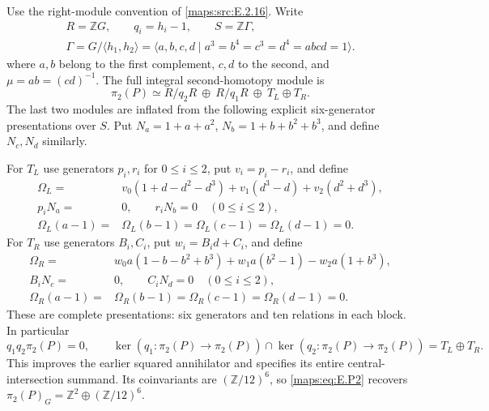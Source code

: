 \begin{theorem}\label{maps:src:E.2.17}


Use the right-module convention of \ref{maps:src:E.2.16}. Write
\[
 \begin{gathered}
 R=\mathbb ZG,\qquad q_i=h_i-1,\qquad S=\mathbb Z\Gamma,\\
 \Gamma=G/\langle h_1,h_2\rangle
  =\langle a,b,c,d\mid a^3=b^4=c^3=d^4=abcd=1\rangle.
 \end{gathered}
 \tag{E.P1}\label{maps:eq:E.P1}
\]
where $a,b$ belong to the first complement, $c,d$ to
the second, and $\mu=ab=(cd)^{-1}$. The full integral
second-homotopy module is
\[
 \pi_2(P)\simeq R/q_2R\ \oplus\ R/q_1R
                    \ \oplus\ T_L\oplus T_R.
 \tag{E.P2}\label{maps:eq:E.P2}
\]
The last two modules are inflated from the following
explicit six-generator presentations over $S$.
Put $N_a=1+a+a^2$, $N_b=1+b+b^2+b^3$, and define
$N_c,N_d$ similarly.

For $T_L$ use generators $p_i,r_i$ for $0\leq i\leq2$,
put $v_i=p_i-r_i$, and define
\[
 \begin{split}
 \Omega_L={}&v_0(1+d-d^2-d^3)
       +v_1(d^3-d)+v_2(d^2+d^3),\\
 p_iN_a={}&0,\qquad r_iN_b=0\quad(0\leq i\leq2),\\
 \Omega_L(a-1)={}&\Omega_L(b-1)
       =\Omega_L(c-1)=\Omega_L(d-1)=0.
 \end{split}
 \tag{E.P3}\label{maps:eq:E.P3}
\]
For $T_R$ use generators $B_i,C_i$, put $w_i=B_id+C_i$,
and define
\[
 \begin{split}
 \Omega_R={}&w_0a(1-b-b^2+b^3)
              +w_1a(b^2-1)-w_2a(1+b^3),\\
 B_iN_c={}&0,\qquad C_iN_d=0\quad(0\leq i\leq2),\\
 \Omega_R(a-1)={}&\Omega_R(b-1)
       =\Omega_R(c-1)=\Omega_R(d-1)=0.
 \end{split}
 \tag{E.P4}\label{maps:eq:E.P4}
\]
These are complete presentations: six generators and
ten relations in each block. In particular
\[
 q_1q_2\pi_2(P)=0,\qquad
 \ker(q_1:\pi_2(P)\to\pi_2(P))
  \cap\ker(q_2:\pi_2(P)\to\pi_2(P))=T_L\oplus T_R.
 \tag{E.P5}\label{maps:eq:E.P5}
\]
This improves the earlier squared annihilator and
specifies its entire central-intersection summand.
Its coinvariants are $(\mathbb Z/12)^6$, so \eqref{maps:eq:E.P2}
recovers $\pi_2(P)_G=\mathbb Z^2\oplus(\mathbb Z/12)^6$.


\end{theorem}
